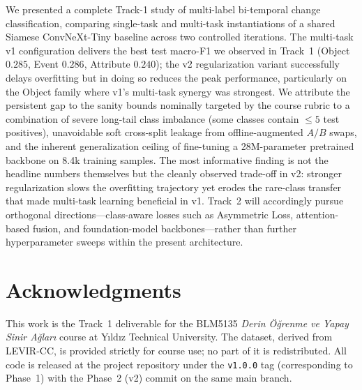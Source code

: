 \documentclass[journal]{IEEEtran}
\begin{document}
We presented a complete Track-1 study of multi-label bi-temporal change classification, comparing single-task and multi-task instantiations of a shared Siamese ConvNeXt-Tiny baseline across two controlled iterations. The multi-task v1 configuration delivers the best test macro-F1 we observed in Track~1 (Object $0.285$, Event $0.286$, Attribute $0.240$); the v2 regularization variant successfully delays overfitting but in doing so reduces the peak performance, particularly on the Object family where v1's multi-task synergy was strongest. We attribute the persistent gap to the sanity bounds nominally targeted by the course rubric to a combination of severe long-tail class imbalance (some classes contain $\le 5$ test positives), unavoidable soft cross-split leakage from offline-augmented $A/B$ swaps, and the inherent generalization ceiling of fine-tuning a 28M-parameter pretrained backbone on 8.4k training samples. The most informative finding is not the headline numbers themselves but the cleanly observed trade-off in v2: stronger regularization slows the overfitting trajectory yet erodes the rare-class transfer that made multi-task learning beneficial in v1. Track~2 will accordingly pursue orthogonal directions---class-aware losses such as Asymmetric Loss, attention-based fusion, and foundation-model backbones---rather than further hyperparameter sweeps within the present architecture.

\section*{Acknowledgments}
This work is the Track~1 deliverable for the BLM5135 \emph{Derin \"O\u{g}renme ve Yapay Sinir A\u{g}lar\i} course at Y\i ld\i z Technical University. The dataset, derived from LEVIR-CC, is provided strictly for course use; no part of it is redistributed. All code is released at the project repository under the \texttt{v1.0.0} tag (corresponding to Phase~1) with the Phase~2 (v2) commit on the same main branch.



\end{document}
